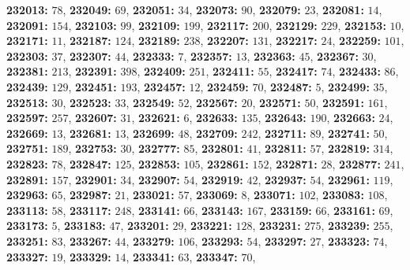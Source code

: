\textsf{\bfseries 232013:} $78$, \textsf{\bfseries 232049:} $69$, \textsf{\bfseries 232051:} $34$, \textsf{\bfseries 232073:} $90$, \textsf{\bfseries 232079:} $23$, \textsf{\bfseries 232081:} $14$, \textsf{\bfseries 232091:} $154$, \textsf{\bfseries 232103:} $99$, \textsf{\bfseries 232109:} $199$, \textsf{\bfseries 232117:} $200$, \textsf{\bfseries 232129:} $229$, \textsf{\bfseries 232153:} $10$, \textsf{\bfseries 232171:} $11$, \textsf{\bfseries 232187:} $124$, \textsf{\bfseries 232189:} $238$, \textsf{\bfseries 232207:} $131$, \textsf{\bfseries 232217:} $24$, \textsf{\bfseries 232259:} $101$, \textsf{\bfseries 232303:} $37$, \textsf{\bfseries 232307:} $44$, \textsf{\bfseries 232333:} $7$, \textsf{\bfseries 232357:} $13$, \textsf{\bfseries 232363:} $45$, \textsf{\bfseries 232367:} $30$, \textsf{\bfseries 232381:} $213$, \textsf{\bfseries 232391:} $398$, \textsf{\bfseries 232409:} $251$, \textsf{\bfseries 232411:} $55$, \textsf{\bfseries 232417:} $74$, \textsf{\bfseries 232433:} $86$, \textsf{\bfseries 232439:} $129$, \textsf{\bfseries 232451:} $193$, \textsf{\bfseries 232457:} $12$, \textsf{\bfseries 232459:} $70$, \textsf{\bfseries 232487:} $5$, \textsf{\bfseries 232499:} $35$, \textsf{\bfseries 232513:} $30$, \textsf{\bfseries 232523:} $33$, \textsf{\bfseries 232549:} $52$, \textsf{\bfseries 232567:} $20$, \textsf{\bfseries 232571:} $50$, \textsf{\bfseries 232591:} $161$, \textsf{\bfseries 232597:} $257$, \textsf{\bfseries 232607:} $31$, \textsf{\bfseries 232621:} $6$, \textsf{\bfseries 232633:} $135$, \textsf{\bfseries 232643:} $190$, \textsf{\bfseries 232663:} $24$, \textsf{\bfseries 232669:} $13$, \textsf{\bfseries 232681:} $13$, \textsf{\bfseries 232699:} $48$, \textsf{\bfseries 232709:} $242$, \textsf{\bfseries 232711:} $89$, \textsf{\bfseries 232741:} $50$, \textsf{\bfseries 232751:} $189$, \textsf{\bfseries 232753:} $30$, \textsf{\bfseries 232777:} $85$, \textsf{\bfseries 232801:} $41$, \textsf{\bfseries 232811:} $57$, \textsf{\bfseries 232819:} $314$, \textsf{\bfseries 232823:} $78$, \textsf{\bfseries 232847:} $125$, \textsf{\bfseries 232853:} $105$, \textsf{\bfseries 232861:} $152$, \textsf{\bfseries 232871:} $28$, \textsf{\bfseries 232877:} $241$, \textsf{\bfseries 232891:} $157$, \textsf{\bfseries 232901:} $34$, \textsf{\bfseries 232907:} $54$, \textsf{\bfseries 232919:} $42$, \textsf{\bfseries 232937:} $54$, \textsf{\bfseries 232961:} $119$, \textsf{\bfseries 232963:} $65$, \textsf{\bfseries 232987:} $21$, \textsf{\bfseries 233021:} $57$, \textsf{\bfseries 233069:} $8$, \textsf{\bfseries 233071:} $102$, \textsf{\bfseries 233083:} $108$, \textsf{\bfseries 233113:} $58$, \textsf{\bfseries 233117:} $248$, \textsf{\bfseries 233141:} $66$, \textsf{\bfseries 233143:} $167$, \textsf{\bfseries 233159:} $66$, \textsf{\bfseries 233161:} $69$, \textsf{\bfseries 233173:} $5$, \textsf{\bfseries 233183:} $47$, \textsf{\bfseries 233201:} $29$, \textsf{\bfseries 233221:} $128$, \textsf{\bfseries 233231:} $275$, \textsf{\bfseries 233239:} $255$, \textsf{\bfseries 233251:} $83$, \textsf{\bfseries 233267:} $44$, \textsf{\bfseries 233279:} $106$, \textsf{\bfseries 233293:} $54$, \textsf{\bfseries 233297:} $27$, \textsf{\bfseries 233323:} $74$, \textsf{\bfseries 233327:} $19$, \textsf{\bfseries 233329:} $14$, \textsf{\bfseries 233341:} $63$, \textsf{\bfseries 233347:} $70$, 

